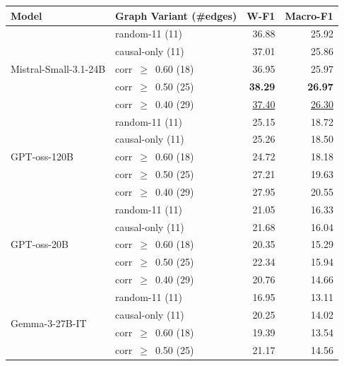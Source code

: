 \begin{table}[t]
\centering
\small
\setlength{\tabcolsep}{6pt}
\renewcommand{\arraystretch}{1.2}
\begin{tabular}{l l rr}
\toprule
\textbf{Model} & \textbf{Graph Variant (\#edges)} & \textbf{W-F1} & \textbf{Macro-F1} \\
\midrule
\multirow{5}{*}{Mistral-Small-3.1-24B}
  & random-11        (11) & 36.88              & 25.92              \\
  & causal-only      (11) & 37.01              & 25.86              \\
  & corr~$\geq$~0.60 (18) & 36.95              & 25.97              \\
  & corr~$\geq$~0.50 (25) & \textbf{38.29}     & \textbf{26.97}     \\
  & corr~$\geq$~0.40 (29) & \underline{37.40}  & \underline{26.30}     \\[3pt]
\multirow{5}{*}{GPT-oss-120B}
  & random-11        (11) & 25.15              & 18.72              \\
  & causal-only      (11) & 25.26              & 18.50              \\
  & corr~$\geq$~0.60 (18) & 24.72              & 18.18              \\
  & corr~$\geq$~0.50 (25) & 27.21              & 19.63              \\
  & corr~$\geq$~0.40 (29) & 27.95              & 20.55              \\[3pt]
\multirow{5}{*}{GPT-oss-20B}
  & random-11        (11) & 21.05              & 16.33              \\
  & causal-only      (11) & 21.68              & 16.04              \\
  & corr~$\geq$~0.60 (18) & 20.35              & 15.29              \\
  & corr~$\geq$~0.50 (25) & 22.34              & 15.94              \\
  & corr~$\geq$~0.40 (29) & 20.76              & 14.66              \\[3pt]
\multirow{5}{*}{Gemma-3-27B-IT}
  & random-11        (11) & 16.95              & 13.11              \\
  & causal-only      (11) & 20.25              & 14.02              \\
  & corr~$\geq$~0.60 (18) & 19.39              & 13.54              \\
  & corr~$\geq$~0.50 (25) & 21.17              & 14.56              \\

\end{tabular}
\end{table}
